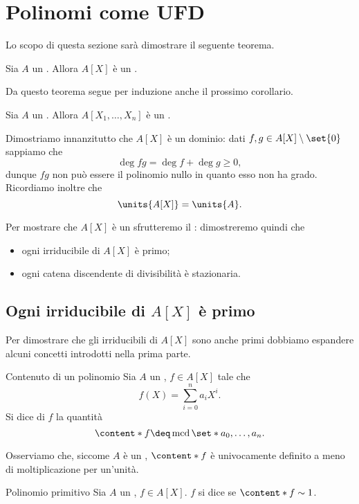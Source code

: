 \section{Polinomi come UFD}

Lo scopo di questa sezione sarà dimostrare il seguente teorema.
\begin{theorem}{}{}
    Sia $A$ un \UFD. Allora $A[X]$ è un \UFD.
\end{theorem}

Da questo teorema segue per induzione anche il prossimo corollario.
\begin{corollary}{}{}
    Sia $A$ un \UFD. Allora $A[X_1, \dots, X_n]$ è un \UFD.
\end{corollary}

Dimostriamo innanzitutto che $A[X]$ è un dominio: dati $f, g \in A[X] \setminus \set{0}$ sappiamo che \[
    \deg fg = \deg f + \deg g \geq 0,    
\] dunque $fg$ non può essere il polinomio nullo in quanto esso non ha grado. Ricordiamo inoltre che \[
    \units{A[X]} = \units{A}.    
\]

Per mostrare che $A[X]$ è un \UFD  sfrutteremo il : dimostreremo quindi che \begin{itemize}
    \item ogni irriducibile di $A[X]$ è primo;
    \item ogni catena discendente di divisibilità è stazionaria.
\end{itemize}

\subsection*{Ogni irriducibile di $A[X]$ è primo}

Per dimostrare che gli irriducibili di $A[X]$ sono anche primi dobbiamo espandere alcuni concetti introdotti nella prima parte.

\begin{definition}
    {Contenuto di un polinomio}{}
    Sia $A$ un \UFD, $f \in A[X]$ tale che \[
        f(X) = \sum_{i=0}^n a_iX^i.    
    \] Si dice  di $f$ la quantità \[
        \content*{f} \deq \operatorname{mcd}\set*{a_0, \dots, a_n}.
    \]
\end{definition}

Osserviamo che, siccome $A$ è un \UFD, $\content*{f}$ è univocamente definito a meno di moltiplicazione per un'unità.

\begin{definition}
    {Polinomio primitivo}{}
    Sia $A$ un \UFD, $f \in A[X]$. $f$ si dice  se $\content*{f} \sim 1$.
\end{definition}

